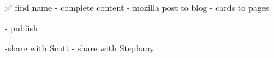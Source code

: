 ✅ find name 
- complete content
- mozilla post to blog 
- cards to pages

- publish 

-share with Scott
- share with Stephany
